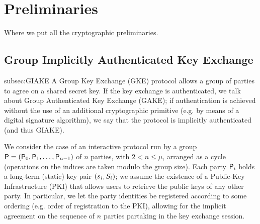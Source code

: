 \section{Preliminaries}\label{sec:preliminaries}
Where we put all the cryptographic preliminaries.

\subsection{Group Implicitly Authenticated Key Exchange}{subsec:GIAKE}
A Group Key Exchange (GKE) protocol allows a group of parties to agree on a shared secret key. 
If the key exchange is authenticated, we talk about Group Authenticated Key Exchange (GAKE); if authentication is achieved without the use of an additional cryptographic primitive (e.g. by means of a digital signature algorithm), we say that the protocol is implicitly authenticated (and thus GIAKE).

We consider the case of an interactive protocol run by a group $\PartySet = (\Party_0,\allowbreak \Party_1,\dots,\Party_{n-1})$ of $n$ parties, with $2 < n \leq \mu$, arranged as a cycle (operations on the indices are taken modulo the group size).
Each party $\User[i]$ holds a long-term (static) key pair $(\ssk_i,\spk_i)$; we assume the existence of a Public-Key Infrastructure (PKI) that allows users to retrieve the public keys of any other party.
In particular, we let the party identities be registered according to some ordering (e.g. order of registration to the PKI), allowing for the implicit agreement on the sequence of $n$ parties partaking in the key exchange session.

